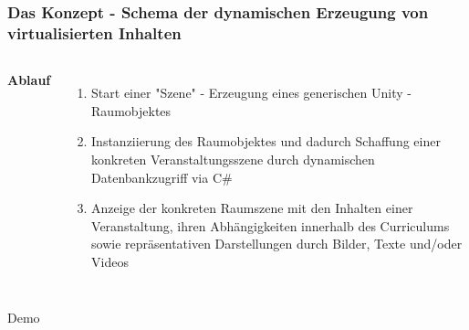 \documentclass{beamer}
\begin{document}

\begin{frame}
\frametitle{Das Konzept - Schema der dynamischen Erzeugung von virtualisierten Inhalten}
\begin{adjustbox}{totalheight=\baselineskip}
\begin{columns}[c] %


\textbf{Ablauf}
\begin{enumerate}
\item Start einer "Szene" -  Erzeugung eines generischen Unity - Raumobjektes
\item Instanziierung des Raumobjektes und dadurch Schaffung einer konkreten Veranstaltungsszene durch dynamischen Datenbankzugriff via C\#
\item  Anzeige der konkreten Raumszene mit den Inhalten einer Veranstaltung, ihren Abhängigkeiten innerhalb des Curriculums sowie repräsentativen Darstellungen durch Bilder, Texte und/oder Videos
\end{enumerate}



\end{columns}
\end{adjustbox}
\end{frame}


\begin{frame}
\Huge{\centerline{Demo}}
\end{frame}
\end{document}
